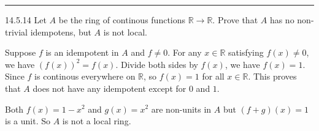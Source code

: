 \documentclass[a4paper, 12pt]{article}
\begin{document}
\noindent\rule{7in}{2.8pt}
\begin{problem}{14.5.14}
Let \(A\) be the ring of continous functions \(\mathbb{R}\rightarrow \mathbb{R}\). Prove that \(A\) has no non-trivial idempotens, but \(A\) is not local.
\end{problem}
\begin{solution}
Suppose \(f\) is an idempotent in \(A\) and \(f\neq 0\). For any \(x\in \mathbb{R}\) satisfying \(f(x)\neq 0\), we have \((f(x))^2=f(x)\). Divide both sides by \(f(x)\), we have 
\(f(x)=1\). Since \(f\) is continous everywhere on \(\mathbb{R}\), so \(f(x)=1\) for all \(x\in \mathbb{R}\). This proves that \(A\) does not have any idempotent except for \(0\) and \(1\).

Both \(f(x)=1-x^2\) and \(g(x)=x^2\) are non-units in \(A\) but \((f+g)(x)=1\) is a unit. So \(A\) is not a local ring.
\end{solution}
\end{document}
